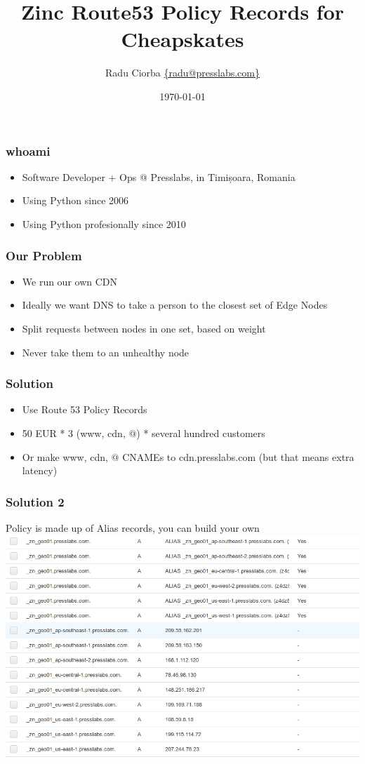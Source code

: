 \documentclass{beamer}
\title[Zinc R53 Policy Records for Cheapskates]{Zinc Route53 Policy Records for Cheapskates} %
\author{Radu Ciorba \href{mailto:radu@presslabs.com}{\{radu@presslabs.com\}}} %
\date{\today} %
\begin{document}
\begin{frame}
  \titlepage %
\end{frame}

\begin{frame}
  \frametitle{whoami}
  \begin{itemize}
  \item Software Developer + Ops @ Presslabs, in Timișoara, Romania
  \item Using Python since 2006
  \item Using Python profesionally since 2010
  \end{itemize}
\end{frame}


\begin{frame}
  \frametitle{Our Problem}
  \begin{itemize}
  \item We run our own CDN
  \item Ideally we want DNS to take a person to the closest set of Edge Nodes
  \item Split requests between nodes in one set, based on weight
  \item Never take them to an unhealthy node
  \end{itemize}
\end{frame}

\begin{frame}
  \frametitle{Solution}
  \begin{itemize}
  \item Use Route 53 Policy Records
  \item 50 EUR * 3 (www, cdn, @) * several hundred customers
  \item Or make www, cdn, @ CNAMEs to cdn.presslabs.com (but that means extra latency)
  \end{itemize}
\end{frame}

\begin{frame}
  \frametitle{Solution 2}
  Policy is made up of Alias records, you can build your own
  \includegraphics[scale=0.38,keepaspectratio=true]{./images/aws-policy-tree.png}

\end{frame}
\end{document}
